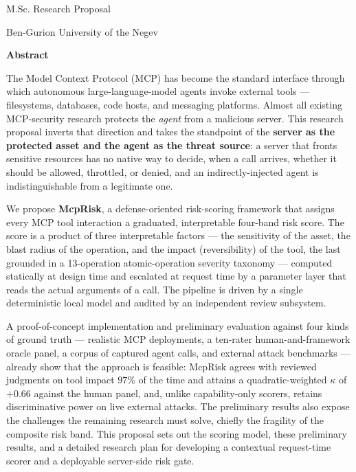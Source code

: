 \thispagestyle{plain}

\begin{center}
    \Large
    \thesistitle

    \vspace{0.4cm}
    \large
    \thesisauthorname
       
    \vspace{0.4cm}
    \large
    M.Sc. Research Proposal
      
    \vspace{0.2cm}
    \large
    Ben-Gurion University of the Negev 
    
    \vspace{0.2cm}
    \large
    \thesisyear
    
    \vspace{0.9cm}
    \Large
    \textbf{Abstract}
\end{center}

The Model Context Protocol (MCP) has become the standard interface through
which autonomous large-language-model agents invoke external tools ---
filesystems, databases, code hosts, and messaging platforms. Almost all
existing MCP-security research protects the \emph{agent} from a malicious
server. This research proposal inverts that direction and takes the standpoint
of the \textbf{server as the protected asset and the agent as the threat
source}: a server that fronts sensitive resources has no native way to decide,
when a call arrives, whether it should be allowed, throttled, or denied, and an
indirectly-injected agent is indistinguishable from a legitimate one.

We propose \textbf{McpRisk}, a defense-oriented
risk-scoring framework that assigns every MCP tool interaction a graduated,
interpretable four-band risk score. The score is a product of three
interpretable factors --- the sensitivity of the asset, the blast radius of the
operation, and the impact (reversibility) of the tool, the last grounded in a
13-operation atomic-operation severity taxonomy --- computed statically at
design time and escalated at request time by a parameter layer that reads the
actual arguments of a call. The pipeline is driven by a single deterministic
local model and audited by an independent review subsystem.

A proof-of-concept implementation and preliminary evaluation against four kinds
of ground truth --- realistic MCP deployments, a ten-rater human-and-framework
oracle panel, a corpus of captured agent calls, and external attack benchmarks
--- already show that the approach is feasible: McpRisk agrees with reviewed
judgments on tool impact $97\%$ of the time and attains a quadratic-weighted
$\kappa$ of $+0.66$ against the human panel, and, unlike capability-only scorers,
retains discriminative power on live external attacks. The preliminary results
also expose the challenges the remaining research must solve, chiefly the
fragility of the composite risk band. This proposal sets out the scoring model,
these preliminary results, and a detailed research plan for developing a
contextual request-time scorer and a deployable server-side risk gate.




